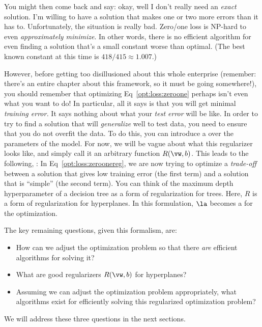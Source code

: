 You might then come back and say: okay, well I don't really need an
\emph{exact} solution.  I'm willing to have a solution that makes one
or two more errors than it has to.  Unfortunately, the situation is
really bad.  Zero/one loss is NP-hard to even \emph{approximately
  minimize}.  In other words, there is no efficient algorithm for even
finding a solution that's a small constant worse than optimal.  (The
best known constant at this time is $418/415 \approx 1.007$.)

However, before getting too disillusioned about this whole enterprise
(remember: there's an entire chapter about this framework, so it must
be going somewhere!), you should remember that optimizing
Eq~\eqref{opt:loss:zeroone} perhaps isn't even what you want to do!
In particular, all it says is that you will get minimal \emph{training
  error.}  It says nothing about what your \emph{test error} will be
like.  In order to try to find a solution that will \emph{generalize}
well to test data, you need to ensure that you do not overfit the
data.  To do this, you can introduce a  over the
parameters of the model.  For now, we will be vague about what this
regularizer looks like, and simply call it an arbitrary function
$R(\vw,b)$.  This leads to the following, :
%
%
In Eq~\eqref{opt:loss:zeroonereg}, we are now trying to optimize a
\emph{trade-off} between a solution that gives low training error (the
first term) and a solution that is ``simple'' (the second term).  You
can think of the maximum depth hyperparameter of a decision tree as a
form of regularization for trees.  Here, $R$ is a form of
regularization for hyperplanes.  In this formulation, $\la$ becomes a
 for the optimization.


The key remaining questions, given this formalism, are:
\begin{itemize}
\item How can we adjust the optimization problem so that there
  \emph{are} efficient algorithms for solving it?
\item What are good regularizers $R(\vw,b)$ for hyperplanes?
\item Assuming we can adjust the optimization problem appropriately,
  what algorithms exist for efficiently solving this regularized
  optimization problem?
\end{itemize}
We will address these three questions in the next sections.


